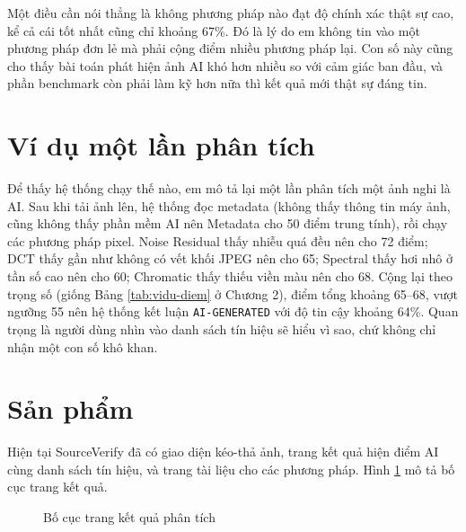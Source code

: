 \documentclass[14pt,a4paper,oneside]{report}
\begin{document}
Một điều cần nói thẳng là không phương pháp nào đạt độ chính xác thật sự cao, kể cả cái tốt nhất cũng chỉ khoảng 67\%. Đó là lý do em không tin vào một phương pháp đơn lẻ mà phải cộng điểm nhiều phương pháp lại. Con số này cũng cho thấy bài toán phát hiện ảnh AI khó hơn nhiều so với cảm giác ban đầu, và phần benchmark còn phải làm kỹ hơn nữa thì kết quả mới thật sự đáng tin.

\section{Ví dụ một lần phân tích}
Để thấy hệ thống chạy thế nào, em mô tả lại một lần phân tích một ảnh nghi là AI. Sau khi tải ảnh lên, hệ thống đọc metadata (không thấy thông tin máy ảnh, cũng không thấy phần mềm AI nên Metadata cho 50 điểm trung tính), rồi chạy các phương pháp pixel. Noise Residual thấy nhiễu quá đều nên cho 72 điểm; DCT thấy gần như không có vết khối JPEG nên cho 65; Spectral thấy hơi nhô ở tần số cao nên cho 60; Chromatic thấy thiếu viền màu nên cho 68. Cộng lại theo trọng số (giống Bảng \ref{tab:vidu-diem} ở Chương 2), điểm tổng khoảng 65--68, vượt ngưỡng 55 nên hệ thống kết luận \texttt{AI-GENERATED} với độ tin cậy khoảng 64\%. Quan trọng là người dùng nhìn vào danh sách tín hiệu sẽ hiểu vì sao, chứ không chỉ nhận một con số khô khan.

\section{Sản phẩm}
Hiện tại SourceVerify đã có giao diện kéo-thả ảnh, trang kết quả hiện điểm AI cùng danh sách tín hiệu, và trang tài liệu cho các phương pháp. Hình \ref{fig:ui-mockup} mô tả bố cục trang kết quả.

\begin{figure}[H]
\centering
{}
\caption{Bố cục trang kết quả phân tích}
\label{fig:ui-mockup}
\end{figure}
\end{document}
